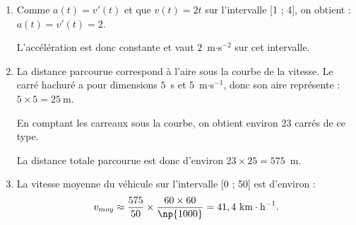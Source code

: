\begin{enumerate}[start=2]
\item Comme $a(t)=v'(t)$ et que $v(t)=2t$ sur l'intervalle [1 ; 4], on obtient :$a(t)=v'(t)=2$.

L'accélération est donc constante et vaut $2$~m$\cdot$s$^{-2}$ sur cet intervalle.

\item La distance parcourue correspond à l'aire sous la courbe de la vitesse. Le carré hachuré a pour dimensions $5$~s et $5$~m$\cdot$s$^{-1}$, donc son aire représente : $5\times 5=25~\text{m}$.

En comptant les carreaux sous la courbe, on obtient environ $23$ carrés de ce type.

La distance totale parcourue est donc d'environ $23\times 25=575$~m.

\item La vitesse moyenne du véhicule sur l'intervalle [0 ; 50] est d'environ :
\[v_{moy} \approx \dfrac{575}{50} \times \dfrac{60 \times 60}{\np{1000}}=41,4~\text{km}\cdot\text{h}^{-1}.\]
\end{enumerate}

\bigskip
